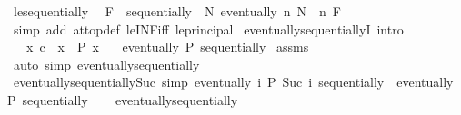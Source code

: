 \begin{isabellebody}
\endisatagproof
{\isafoldproof}%
%
\isadelimproof
\isanewline
%
\endisadelimproof
\isanewline
{}\isamarkupfalse%
\ le{\isacharunderscore}{\kern0pt}sequentially{\isacharcolon}{\kern0pt}\isanewline
\ \ {\isachardoublequoteopen}F\ {\isasymle}\ sequentially\ {\isasymlongleftrightarrow}\ {\isacharparenleft}{\kern0pt}{\isasymforall}N{\isachardot}{\kern0pt}\ eventually\ {\isacharparenleft}{\kern0pt}{\isasymlambda}n{\isachardot}{\kern0pt}\ N\ {\isasymle}\ n{\isacharparenright}{\kern0pt}\ F{\isacharparenright}{\kern0pt}{\isachardoublequoteclose}\isanewline
%
\isadelimproof
\ \ %
\endisadelimproof
%
\isatagproof
{}\isamarkupfalse%
\ {\isacharparenleft}{\kern0pt}simp\ add{\isacharcolon}{\kern0pt}\ at{\isacharunderscore}{\kern0pt}top{\isacharunderscore}{\kern0pt}def\ le{\isacharunderscore}{\kern0pt}INF{\isacharunderscore}{\kern0pt}iff\ le{\isacharunderscore}{\kern0pt}principal{\isacharparenright}{\kern0pt}%
\endisatagproof
{\isafoldproof}%
%
\isadelimproof
\isanewline
%
\endisadelimproof
\isanewline
{}\isamarkupfalse%
\ eventually{\isacharunderscore}{\kern0pt}sequentiallyI\ {\isacharbrackleft}{\kern0pt}intro{\isacharquery}{\kern0pt}{\isacharbrackright}{\kern0pt}{\isacharcolon}{\kern0pt}\isanewline
\ \ \ {\isachardoublequoteopen}{\isasymAnd}x{\isachardot}{\kern0pt}\ c\ {\isasymle}\ x\ {\isasymLongrightarrow}\ P\ x{\isachardoublequoteclose}\isanewline
\ \ \ {\isachardoublequoteopen}eventually\ P\ sequentially{\isachardoublequoteclose}\isanewline
%
\isadelimproof
%
\endisadelimproof
%
\isatagproof
{}\isamarkupfalse%
\ assms\ \isamarkupfalse%
\ {\isacharparenleft}{\kern0pt}auto\ simp{\isacharcolon}{\kern0pt}\ eventually{\isacharunderscore}{\kern0pt}sequentially{\isacharparenright}{\kern0pt}%
\endisatagproof
{\isafoldproof}%
%
\isadelimproof
\isanewline
%
\endisadelimproof
\isanewline
{}\isamarkupfalse%
\ eventually{\isacharunderscore}{\kern0pt}sequentially{\isacharunderscore}{\kern0pt}Suc\ {\isacharbrackleft}{\kern0pt}simp{\isacharbrackright}{\kern0pt}{\isacharcolon}{\kern0pt}\ {\isachardoublequoteopen}eventually\ {\isacharparenleft}{\kern0pt}{\isasymlambda}i{\isachardot}{\kern0pt}\ P\ {\isacharparenleft}{\kern0pt}Suc\ i{\isacharparenright}{\kern0pt}{\isacharparenright}{\kern0pt}\ sequentially\ {\isasymlongleftrightarrow}\ eventually\ P\ sequentially{\isachardoublequoteclose}\isanewline
%
\isadelimproof
\ \ %
\endisadelimproof
%
\isatagproof
{}\isamarkupfalse%
\ eventually{\isacharunderscore}{\kern0pt}sequentially\ \isamarkupfalse%

\end{isabellebody}
